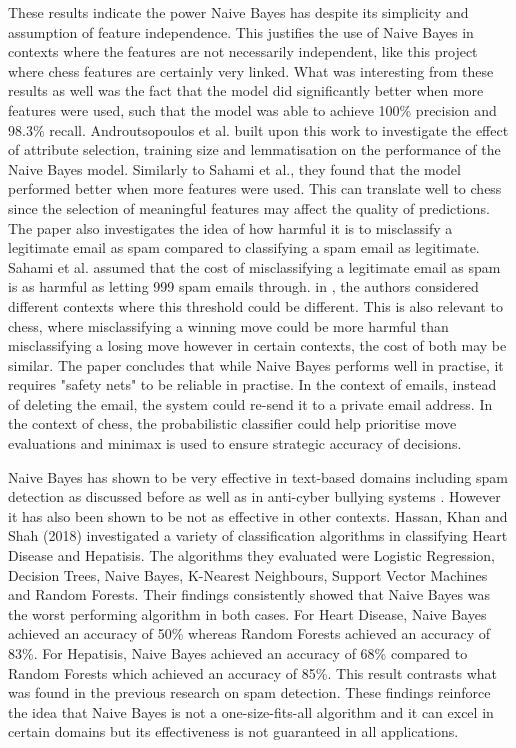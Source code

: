 These results indicate the power Naive Bayes has despite its simplicity and assumption of feature independence. This justifies the use of Naive Bayes in contexts where the features are not necessarily independent, like this project where chess features are certainly very linked. What was interesting from these results as well was the fact that the model did significantly better when more features were used, such that the model was able to achieve 100\% precision and 98.3\% recall. Androutsopoulos et al. built upon this work to investigate the effect of attribute selection, training size and lemmatisation on the performance of the Naive Bayes model. Similarly to Sahami et al., they found that the model performed better when more features were used. This can translate well to chess since the selection of meaningful features may affect the quality of predictions. The paper also investigates the idea of how harmful it is to misclassify a legitimate email as spam compared to classifying a spam email as legitimate. Sahami et al. assumed that the cost of misclassifying a legitimate email as spam is as harmful as letting 999 spam emails through. in \cite{androutsopoulosEvaluationNaiveBayesian2000}, the authors considered different contexts where this threshold could be different. This is also relevant to chess, where misclassifying a winning move could be more harmful than misclassifying a losing move however in certain contexts, the cost of both may be similar. The paper concludes that while Naive Bayes performs well in practise, it requires "safety nets" to be reliable in practise. In the context of emails, instead of deleting the email, the system could re-send it to a private email address. In the context of chess, the probabilistic classifier could help prioritise move evaluations and minimax is used to ensure strategic accuracy of decisions. 

Naive Bayes has shown to be very effective in text-based domains including spam detection as discussed before as well as in anti-cyber bullying systems \cite{igeAIPoweredAntiCyber2022}. However it has also been shown to be not as effective in other contexts. Hassan, Khan and Shah (2018) investigated a variety of classification algorithms in classifying Heart Disease and Hepatisis. The algorithms they evaluated were Logistic Regression, Decision Trees, Naive Bayes, K-Nearest Neighbours, Support Vector Machines and Random Forests. Their findings consistently showed that Naive Bayes was the worst performing algorithm in both cases. For Heart Disease, Naive Bayes achieved an accuracy of 50\% whereas Random Forests achieved an accuracy of 83\%. For Hepatisis, Naive Bayes achieved an accuracy of 68\% compared to Random Forests which achieved an accuracy of 85\%. This result contrasts what was found in the previous research on spam detection. These findings reinforce the idea that Naive Bayes is not a one-size-fits-all algorithm and it can excel in certain domains but its effectiveness is not guaranteed in all applications. 

